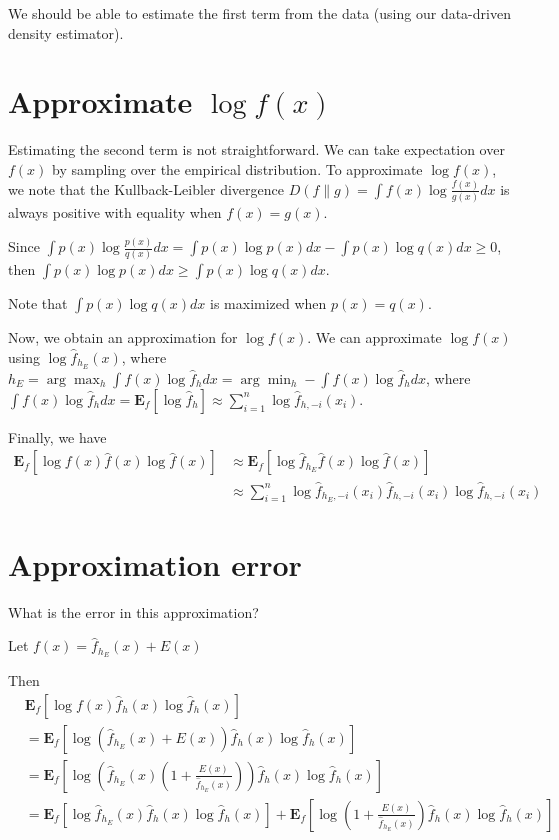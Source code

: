 \documentclass{article}
\begin{document}
We should be able to estimate the first term from the data (using our data-driven density estimator).

\section{Approximate $\log f(x)$}

Estimating the second term is not straightforward. We can take expectation over $ f(x) $ by sampling over the empirical distribution. To approximate $\log f(x)$, we note that the Kullback-Leibler divergence $ D(f\|g) = \int f(x) \log \frac{f(x)}{g(x)} dx $ is always positive with equality when $ f(x) = g(x) $.

Since $ \int p(x) \log \frac{p(x)}{q(x)} dx = \int p(x) \log p(x) dx - \int p(x) \log q(x) dx \geq 0 $, then $ \int p(x) \log p(x) dx \geq \int p(x) \log q(x) dx $.

Note that $ \int p(x) \log q(x) dx $ is maximized when $ p(x) = q(x) $.

Now, we obtain an approximation for $ \log f(x) $. We can approximate $ \log f(x) $ using $ \log \hat{f}_{h_E}(x) $, where $ h_E = \arg \max_h \int f(x) \log \hat{f}_h dx = \arg \min_h - \int f(x) \log \hat{f}_h dx $, where $ \int f(x) \log \hat{f}_h dx = \mathbf{E}_f[\log \hat{f}_h] \approx \sum_{i=1}^n \log \hat{f}_{h,-i}(x_i) $.



Finally, we have
\begin{align*}
\mathbf{E}_{f}[\log f(x) \hat{f}(x) \log \hat{f}(x)] & \approx \mathbf{E}_f[ \log \hat{f}_{h_E} \hat{f}(x) \log \hat{f}(x)]\\
& \approx \sum_{i=1}^n \log \hat{f}_{h_E,-i}(x_i) \hat{f}_{h,-i}(x_i) \log \hat{f}_{h,-i}(x_i)
\end{align*}

\section{Approximation error}

What is the error in this approximation?

Let $ f(x) = \hat{f}_{h_E}(x) + E(x) $

Then
\begin{align*}
& \mathbf{E}_f[ \log f(x) \hat{f}_h(x) \log \hat{f}_h(x)]\\
& = \mathbf{E}_f[ \log (\hat{f}_{h_E}(x) + E(x)) \hat{f}_h(x) \log \hat{f}_h(x)]\\
& = \mathbf{E}_f[ \log \left( \hat{f}_{h_E}(x) (1 + \frac{E(x)}{\hat{f}_{h_E}(x)}) \right) \hat{f}_h(x) \log \hat{f}_h(x)]\\
& = \mathbf{E}_f[ \log \hat{f}_{h_E}(x) \hat{f}_h(x) \log \hat{f}_h(x)] + \mathbf{E}_f[ \log \left( 1 + \frac{E(x)}{\hat{f}_{h_E}(x)} \right) \hat{f}_h(x) \log \hat{f}_h(x)]
\end{align*}
\end{document}
